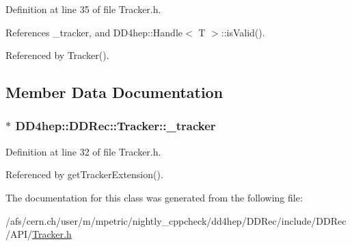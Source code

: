 Definition at line 35 of file Tracker.h.

References \_\-tracker, and DD4hep::Handle$<$ T $>$::isValid().

Referenced by Tracker().

\subsection{Member Data Documentation}
\hypertarget{class_d_d4hep_1_1_d_d_rec_1_1_tracker_a93fc69a19d898507a7c887b9f44b4663}{
\subsubsection[{\_\-tracker}]{$\ast$ {\bf DD4hep::DDRec::Tracker::\_\-tracker}}}
\label{class_d_d4hep_1_1_d_d_rec_1_1_tracker_a93fc69a19d898507a7c887b9f44b4663}


Definition at line 32 of file Tracker.h.

Referenced by getTrackerExtension().

The documentation for this class was generated from the following file:\begin{DoxyCompactItemize}
\item 
/afs/cern.ch/user/m/mpetric/nightly\_\-cppcheck/dd4hep/DDRec/include/DDRec/API/\hyperlink{_tracker_8h}{Tracker.h}\end{DoxyCompactItemize}
